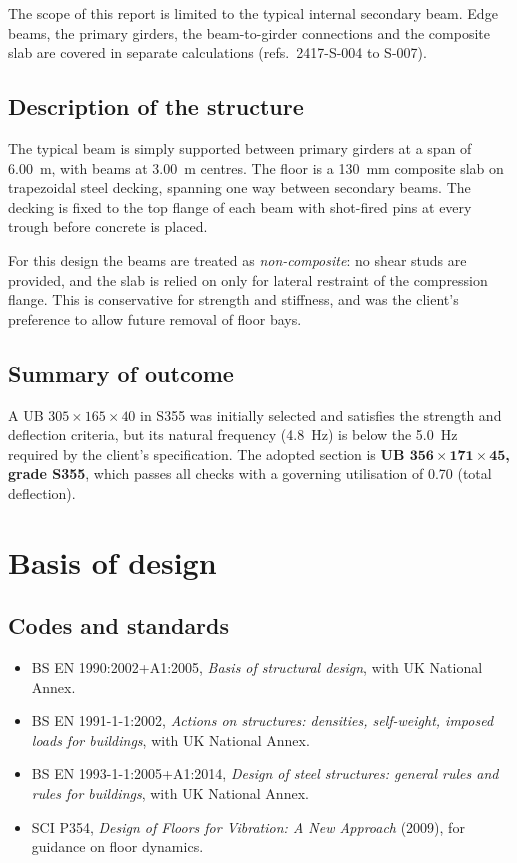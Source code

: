 \documentclass[11pt,a4paper]{article}
\begin{document}
The scope of this report is limited to the typical internal secondary beam. Edge beams, the primary girders, the beam-to-girder connections and the composite slab are covered in separate calculations (refs.\ 2417-S-004 to S-007).

\subsection{Description of the structure}

The typical beam is simply supported between primary girders at a span of \qty{6.00}{\metre}, with beams at \qty{3.00}{\metre} centres. The floor is a \qty{130}{\milli\metre} composite slab on trapezoidal steel decking, spanning one way between secondary beams. The decking is fixed to the top flange of each beam with shot-fired pins at every trough before concrete is placed.

For this design the beams are treated as \emph{non-composite}: no shear studs are provided, and the slab is relied on only for lateral restraint of the compression flange. This is conservative for strength and stiffness, and was the client's preference to allow future removal of floor bays.

\subsection{Summary of outcome}

A UB $305\times165\times40$ in S355 was initially selected and satisfies the strength and deflection criteria, but its natural frequency (\qty{4.8}{\hertz}) is below the \qty{5.0}{\hertz} required by the client's specification. The adopted section is \textbf{UB $\mathbf{356\times171\times45}$, grade S355}, which passes all checks with a governing utilisation of 0.70 (total deflection).

\section{Basis of design}
\label{sec:basis}

\subsection{Codes and standards}

\begin{itemize}[nosep]
  \item BS EN 1990:2002+A1:2005, \emph{Basis of structural design}, with UK National Annex.
  \item BS EN 1991-1-1:2002, \emph{Actions on structures: densities, self-weight, imposed loads for buildings}, with UK National Annex.
  \item BS EN 1993-1-1:2005+A1:2014, \emph{Design of steel structures: general rules and rules for buildings}, with UK National Annex.
  \item SCI P354, \emph{Design of Floors for Vibration: A New Approach} (2009), for guidance on floor dynamics.
\end{itemize}
\end{document}
